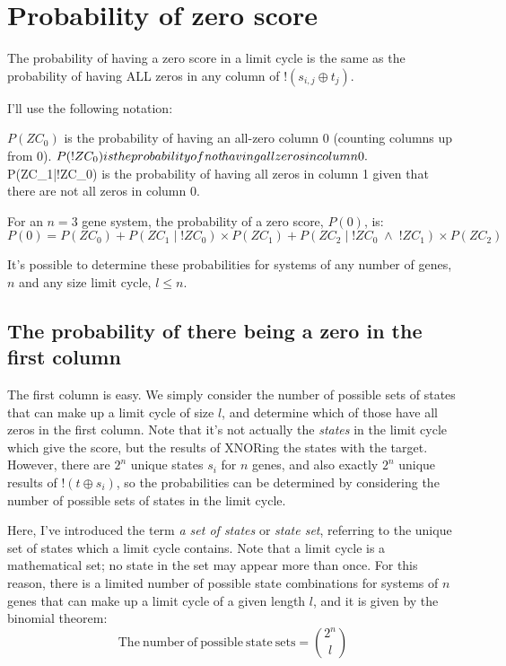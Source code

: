 \documentclass[11pt, a4paper]{article}
\begin{document}
\section{Probability of zero score}

The probability of having a zero score in a limit cycle is the same as
the probability of having ALL zeros in any column of $!(s_{i,j} \oplus
t_j)$.

I'll use the following notation:

$P(ZC_0)$ is the probability of having an all-zero column 0 (counting
columns up from 0). $P(!ZC_0) is the probability of \emph{not} having
all zeros in column 0. $P(ZC_1|!ZC_0) is the probability of having all
zeros in column 1 given that there are not all zeros in column 0.

For an $n=3$ gene system, the probability of a zero score, $P(0)$, is:
\begin{equation} \label{eq:pzero}
P(0) = P(ZC_0) + P(ZC_1\;|\;!ZC_0) \times P(ZC_1) + P(ZC_2\;|\;!ZC_0\;\land\;!ZC_1) \times P(ZC_2)
\end{equation}

It's possible to determine these probabilities for systems of any
number of genes, $n$ and any size limit cycle, $l\leq n $.

\subsection{The probability of there being a zero in the first column}

The first column is easy. We simply consider the number of possible
sets of states that can make up a limit cycle of size $l$, and
determine which of those have all zeros in the first column. Note that
it's not actually the \emph{states} in the limit cycle which give the
score, but the results of XNORing the states with the target. However,
there are $2^n$ unique states $s_i$ for $n$ genes, and also exactly
$2^n$ unique results of $!(t \oplus s_i)$, so the probabilities can be
determined by considering the number of possible sets of states in the
limit cycle.

Here, I've introduced the term \emph{a set of states} or \emph{state
set}, referring to the unique set of states which a limit cycle
contains. Note that a limit cycle is a mathematical set; no state in
the set may appear more than once. For this reason, there is a limited
number of possible state combinations for systems of $n$ genes that
can make up a limit cycle of a given length $l$, and it is given by
the binomial theorem:
\begin{equation}
\mathrm{The~number~of~possible~state~sets} = \binom{2^n}{l}
\end{equation}
\end{document}
